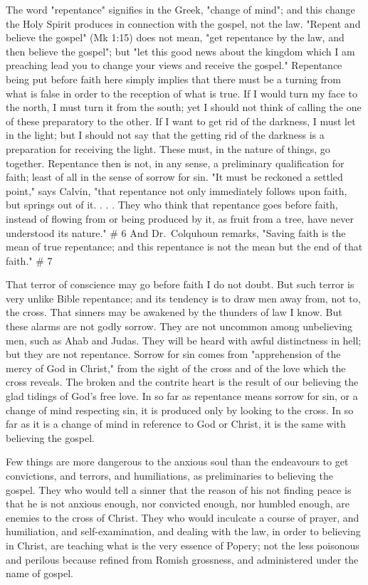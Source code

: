 \documentclass[
]{book}
\begin{document}
The word "repentance" signifies in the Greek, "change of mind"; and this change the Holy Spirit produces in connection with the gospel, not the law. "Repent and believe the gospel" (Mk 1:15) does not mean, "get repentance by the law, and then believe the gospel"; but "let this good news about the kingdom which I am preaching lead you to change your views and receive the gospel." Repentance being put before faith here simply implies that there must be a turning from what is false in order to the reception of what is true. If I would turn my face to the north, I must turn it from the south; yet I should not think of calling the one of these preparatory to the other. If I want to get rid of the darkness, I must let in the light; but I should not say that the getting rid of the darkness is a preparation for receiving the light. These must, in the nature of things, go together. Repentance then is not, in any sense, a preliminary qualification for faith; least of all in the sense of sorrow for sin. "It must be reckoned a settled point," says Calvin, "that repentance not only immediately follows upon faith, but springs out of it. . . . They who think that repentance goes before faith, instead of flowing from or being produced by it, as fruit from a tree, have never understood its nature."
\# 6
And Dr.~Colquhoun remarks, "Saving faith is the mean of true repentance; and this repentance is not the mean but the end of that faith."
\# 7

That terror of conscience may go before faith I do not doubt. But such terror is very unlike Bible repentance; and its tendency is to draw men away from, not to, the cross. That sinners may be awakened by the thunders of law I know. But these alarms are not godly sorrow. They are not uncommon among unbelieving men, such as Ahab and Judas. They will be heard with awful distinctness in hell; but they are not repentance. Sorrow for sin comes from "apprehension of the mercy of God in Christ," from the sight of the cross and of the love which the cross reveals. The broken and the contrite heart is the result of our believing the glad tidings of God's free love. In so far as repentance means sorrow for sin, or a change of mind respecting sin, it is produced only by looking to the cross. In so far as it is a change of mind in reference to God or Christ, it is the same with believing the gospel.

Few things are more dangerous to the anxious soul than the endeavours to get convictions, and terrors, and humiliations, as preliminaries to believing the gospel. They who would tell a sinner that the reason of his not finding peace is that he is not anxious enough, nor convicted enough, nor humbled enough, are enemies to the cross of Christ. They who would inculcate a course of prayer, and humiliation, and self-examination, and dealing with the law, in order to believing in Christ, are teaching what is the very essence of Popery; not the less poisonous and perilous because refined from Romish grossness, and administered under the name of gospel.
\end{document}
